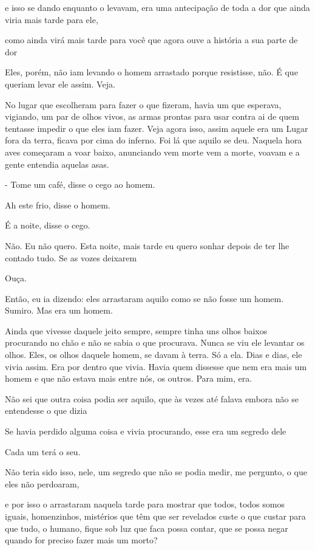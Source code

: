e isso se dando enquanto o levavam, era uma antecipação de toda a dor
que ainda viria mais tarde para ele,

como ainda virá mais tarde para você que agora ouve a história a sua
parte de dor

Eles, porém, não iam levando o homem arrastado porque resistisse, não. É
que queriam levar ele assim. Veja.

No lugar que escolheram para fazer o que fizeram, havia um que esperava,
vigiando, um par de olhos vivos, as armas prontas para usar contra ai de
quem tentasse impedir o que eles iam fazer. Veja agora isso, assim
aquele era um Lugar fora da terra, ficava por cima do inferno. Foi lá
que aquilo se deu. Naquela hora aves começaram a voar baixo, anunciando
vem morte vem a morte, voavam e a gente entendia aquelas asas.

- Tome um café, disse o cego ao homem.

Ah este frio, disse o homem.

É a noite, disse o cego.

Não. Eu não quero. Esta noite, mais tarde eu quero sonhar depois de ter
lhe contado tudo. Se as vozes deixarem

Ouça.

Então, eu ia dizendo: eles arrastaram aquilo como se não fosse um homem.
Sumiro. Mas era um homem.

Ainda que vivesse daquele jeito sempre, sempre tinha uns olhos baixos
procurando no chão e não se sabia o que procurava. Nunca se viu ele
levantar os olhos. Eles, os olhos daquele homem, se davam à terra. Só a
ela. Dias e dias, ele vivia assim. Era por dentro que vivia. Havia quem
dissesse que nem era mais um homem e que não estava mais entre nós, os
outros. Para mim, era.

Não sei que outra coisa podia ser aquilo, que às vezes até falava embora
não se entendesse o que dizia

Se havia perdido alguma coisa e vivia procurando, esse era um segredo
dele

Cada um terá o seu.

Não teria sido isso, nele, um segredo que não se podia medir, me
pergunto, o que eles não perdoaram,

e por isso o arrastaram naquela tarde para mostrar que todos, todos
somos iguais, homenzinhos, mistérios que têm que ser revelados custe o
que custar para que tudo, o humano, fique sob luz que faca possa contar,
que se possa negar quando for preciso fazer mais um morto?

